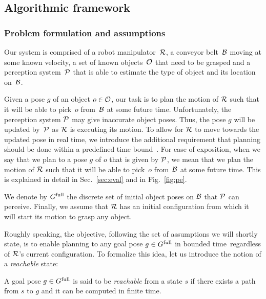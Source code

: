 \documentclass[a4paper,10pt]{article}
\begin{document}
\subsection{Algorithmic framework}
\subsubsection{Problem formulation and assumptions}
Our system is comprised of 
a robot manipulator~$\mathcal{R}$,
a conveyor belt~$\mathcal{B}$ moving at some known velocity,
a set of known objects~$\mathcal{O}$ that need to be grasped and 
a perception system~$\mathcal{P}$ that is able to estimate the type of object and its location on~$\mathcal{B}$.

Given a pose $g$ of an object $o \in \mathcal{O}$, our task is to plan the motion of $\mathcal{R}$ such that it will be able to pick~$o$ from~$\mathcal{B}$ at some future time.
%
Unfortunately, the perception system $\mathcal{P}$ may give inaccurate object poses.
Thus, the pose $g$ will be updated by~$\mathcal{P}$ as $\mathcal{R}$ is executing its motion. 
To allow for $\mathcal{R}$ to move towards the updated pose in real time, we introduce the additional requirement that planning should be done within a predefined time bound~\Tbound.
%
For ease of exposition, when we say that we plan to a pose $g$ of $o$ that is given by $\mathcal{P}$, 
we mean that we plan the motion of $\mathcal{R}$ such that it will be able to pick~$o$ from~$\mathcal{B}$ at some future time. 
This is explained in detail in Sec.~\ref{sec:eval} and in Fig.~\ref{fig:pe}.

%
We denote by $G^{\textrm{full}}$ the discrete set of initial object poses on $\mathcal{B}$ that $\mathcal{P}$ can perceive.
%
Finally, we assume that $\mathcal{R}$ has an initial configuration \Shome from which it will start its motion to grasp any object.


Roughly speaking, the objective, following the set of assumptions we will shortly state, is to enable planning to any goal pose $ g \in G^{\textrm{full}}$ in bounded time~\Tbound regardless of $\mathcal{R}$'s current configuration.
To formalize this idea, let us introduce the notion of a \emph{reachable} state:

\begin{definition}
    A goal pose $g \in G^{\textrm{full}}$ is said to be \emph{reachable} from a state $s$ if there exists a path from $s$ to $g$ and it can be computed in finite time.
\end{definition}
\end{document}
